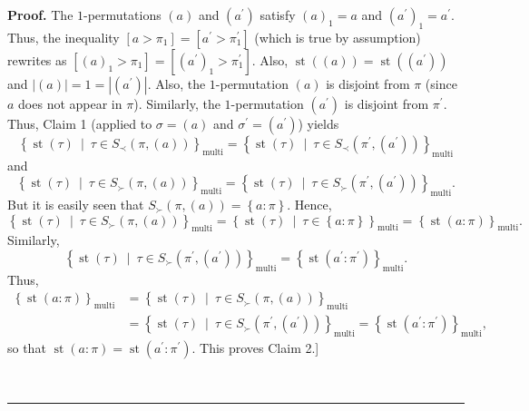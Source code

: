 \documentclass[numbers=enddot,12pt,final,onecolumn,notitlepage]{scrartcl}%
\theoremstyle{definition}
\newenvironment{proof}[1][Proof]{\noindent\textbf{#1.} }{\ \rule{0.5em}{0.5em}}
\newenvironment{verlong}{}{}
\begin{document}
\begin{verlong}
\begin{proof}
The $1$-permutations $\left(  a\right)  $ and $\left(  a^{\prime}\right)  $
satisfy $\left(  a\right)  _{1}=a$ and $\left(  a^{\prime}\right)
_{1}=a^{\prime}$. Thus, the inequality $\left[  a>\pi_{1}\right]  =\left[
a^{\prime}>\pi_{1}^{\prime}\right]  $ (which is true by assumption) rewrites
as $\left[  \left(  a\right)  _{1}>\pi_{1}\right]  =\left[  \left(  a^{\prime
}\right)  _{1}>\pi_{1}^{\prime}\right]  $. Also, $\operatorname*{st}\left(
\left(  a\right)  \right)  =\operatorname*{st}\left(  \left(  a^{\prime
}\right)  \right)  $ and $\left\vert \left(  a\right)  \right\vert
=1=\left\vert \left(  a^{\prime}\right)  \right\vert $. Also, the
$1$-permutation $\left(  a\right)  $ is disjoint from $\pi$ (since $a$ does
not appear in $\pi$). Similarly, the $1$-permutation $\left(  a^{\prime
}\right)  $ is disjoint from $\pi^{\prime}$. Thus, Claim 1 (applied to
$\sigma=\left(  a\right)  $ and $\sigma^{\prime}=\left(  a^{\prime}\right)  $)
yields
\[
\left\{  \operatorname*{st}\left(  \tau\right)  \ \mid\ \tau\in S_{\prec
}\left(  \pi,\left(  a\right)  \right)  \right\}  _{\operatorname*{multi}%
}=\left\{  \operatorname*{st}\left(  \tau\right)  \ \mid\ \tau\in S_{\prec
}\left(  \pi^{\prime},\left(  a^{\prime}\right)  \right)  \right\}
_{\operatorname*{multi}}%
\]
and%
\[
\left\{  \operatorname*{st}\left(  \tau\right)  \ \mid\ \tau\in S_{\succ
}\left(  \pi,\left(  a\right)  \right)  \right\}  _{\operatorname*{multi}%
}=\left\{  \operatorname*{st}\left(  \tau\right)  \ \mid\ \tau\in S_{\succ
}\left(  \pi^{\prime},\left(  a^{\prime}\right)  \right)  \right\}
_{\operatorname*{multi}}.
\]
But it is easily seen that $S_{\succ}\left(  \pi,\left(  a\right)  \right)
=\left\{  a:\pi\right\}  $. Hence,%
\[
\left\{  \operatorname*{st}\left(  \tau\right)  \ \mid\ \tau\in S_{\succ
}\left(  \pi,\left(  a\right)  \right)  \right\}  _{\operatorname*{multi}%
}=\left\{  \operatorname*{st}\left(  \tau\right)  \ \mid\ \tau\in\left\{
a:\pi\right\}  \right\}  _{\operatorname*{multi}}=\left\{  \operatorname*{st}%
\left(  a:\pi\right)  \right\}  _{\operatorname*{multi}}.
\]
Similarly,%
\[
\left\{  \operatorname*{st}\left(  \tau\right)  \ \mid\ \tau\in S_{\succ
}\left(  \pi^{\prime},\left(  a^{\prime}\right)  \right)  \right\}
_{\operatorname*{multi}}=\left\{  \operatorname*{st}\left(  a^{\prime}%
:\pi^{\prime}\right)  \right\}  _{\operatorname*{multi}}.
\]
Thus,%
\begin{align*}
\left\{  \operatorname*{st}\left(  a:\pi\right)  \right\}
_{\operatorname*{multi}}  &  =\left\{  \operatorname*{st}\left(  \tau\right)
\ \mid\ \tau\in S_{\succ}\left(  \pi,\left(  a\right)  \right)  \right\}
_{\operatorname*{multi}}\\
&  =\left\{  \operatorname*{st}\left(  \tau\right)  \ \mid\ \tau\in S_{\succ
}\left(  \pi^{\prime},\left(  a^{\prime}\right)  \right)  \right\}
_{\operatorname*{multi}}=\left\{  \operatorname*{st}\left(  a^{\prime}%
:\pi^{\prime}\right)  \right\}  _{\operatorname*{multi}},
\end{align*}
so that $\operatorname*{st}\left(  a:\pi\right)  =\operatorname*{st}\left(
a^{\prime}:\pi^{\prime}\right)  $. This proves Claim 2.]


\end{proof}
\end{verlong}
\end{document}
